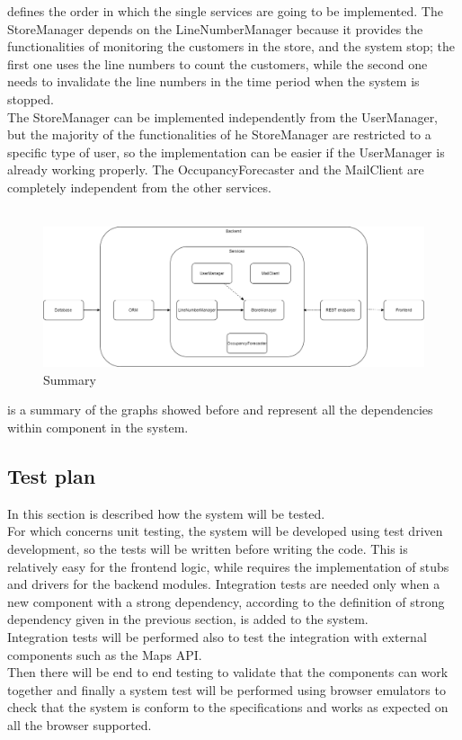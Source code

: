  defines the order in which the single services are going to be implemented.
The StoreManager depends on the LineNumberManager because it provides the functionalities of monitoring the customers in the store, and the
system stop;
the first one uses the line numbers to count the customers, while the second one needs to invalidate the line numbers
in the time period when the system is stopped.\\
The StoreManager can be implemented independently from the UserManager, but the majority of the functionalities of he StoreManager
are restricted to a specific type of user, so the implementation can be easier if the UserManager is already working properly.
The OccupancyForecaster and the MailClient are completely independent from the other services.\\
\\
\begin{figure}[H]
    \centering
    \includegraphics[height=0.4\textwidth]{Images/IntegrationAndTestingPlan/Summary.png}
    \caption{Summary}
    \label{fig:Summary}
\end{figure}
 is a summary of the graphs showed before and represent all the dependencies within component in the system.

\subsection{Test plan}
In this section is described how the system will be tested. \\
For which concerns unit testing, the system will be developed using test driven development, so the tests will be written before writing the code.
This is relatively easy for the frontend logic, while requires the implementation of stubs and drivers for the backend modules.
Integration tests are needed only when a new component with a strong dependency, according to the definition of strong dependency
given in the previous section, is added to the system. \\
Integration tests will be performed also to test the integration with external components such as the Maps API. \\
Then there will be end to end testing to validate that the components can work together and finally a system test will be performed
using browser emulators to check that the system is conform to the specifications and works as expected on all the browser supported.
